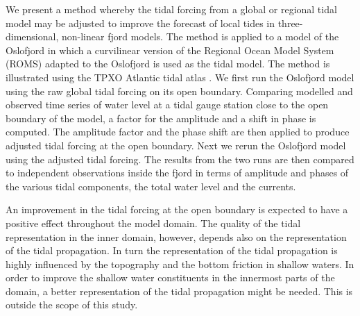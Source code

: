 We present a method whereby the tidal forcing from a global or regional tidal model may be adjusted to improve the forecast of local tides in three-dimensional, non-linear fjord models. 
The method is applied to a model of the Oslofjord in which a curvilinear version of the Regional Ocean Model System (ROMS) \citep{shchepetkin05,shchepetkin09,haidvogel08} adapted to the Oslofjord is used as the tidal model. The method is illustrated using the TPXO Atlantic tidal atlas \citep{egbert94,egbert02}.
We first run the Oslofjord model using the raw global tidal forcing on its open boundary. Comparing modelled and observed time series of water level at a tidal gauge station close to the open boundary of the model, a factor for the amplitude and a shift in phase is computed. The amplitude factor and the phase shift are then applied to produce adjusted tidal forcing at the open boundary. Next we rerun the Oslofjord model using the adjusted tidal forcing. The results from the two runs are then compared to independent observations inside the fjord in terms of amplitude and phases of the various tidal components, the total water level and the currents.

An improvement in the tidal forcing at the open boundary is expected to have a positive effect throughout the model domain. The quality of the tidal representation in the inner domain, however, depends also on the representation of the tidal propagation. In turn the representation of the tidal propagation is highly influenced by the topography and the bottom friction in shallow waters. In order to improve the shallow water constituents in the innermost parts of the domain, a better representation of the tidal propagation might be needed. This is outside the scope of this study. 
